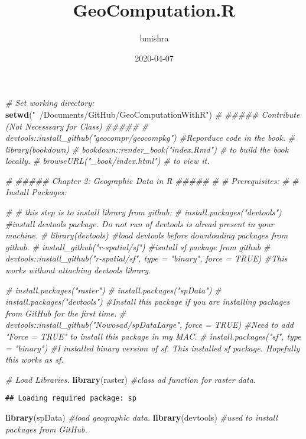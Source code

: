 \documentclass[]{article}
\title{GeoComputation.R}
\author{bmishra}
\date{2020-04-07}
\newenvironment{Shaded}{\begin{snugshade}}{\end{snugshade}}
\newcommand{\CommentTok}[1]{\textcolor[rgb]{0.56,0.35,0.01}{\textit{#1}}}
\newcommand{\KeywordTok}[1]{\textcolor[rgb]{0.13,0.29,0.53}{\textbf{#1}}}
\newcommand{\NormalTok}[1]{#1}
\newcommand{\StringTok}[1]{\textcolor[rgb]{0.31,0.60,0.02}{#1}}
\begin{document}
\maketitle

\begin{Shaded}
\begin{Highlighting}[]
\CommentTok{# Set working directory:}
\KeywordTok{setwd}\NormalTok{(}\StringTok{"~/Documents/GitHub/GeoComputationWithR"}\NormalTok{)}
\CommentTok{# ##### Contribute  (Not Necesssary for Class) #####}
\CommentTok{# devtools::install_github("geocompr/geocompkg") #Reporduce code in the book.}
\CommentTok{# library(bookdown)}
\CommentTok{# bookdown::render_book("index.Rmd") # to build the book locally.}
\CommentTok{# browseURL("_book/index.html") # to view it.}


\CommentTok{# ##### Chapter 2: Geographic Data in R #####}
\CommentTok{# # Prerequisites:}
\CommentTok{# # Install Packages:}

\CommentTok{# # this step is to install library from github:}
\CommentTok{# install.packages("devtools") #install devtools package. Do not run of devtools is alread present in your machine.}
\CommentTok{# library(devtools) #load devtools before downloading packages from github.}
\CommentTok{# install_github("r-spatial/sf") #isntall sf package from github}
\CommentTok{# devtools::install_github("r-spatial/sf", type = "binary", force = TRUE) #This works without attaching devtools library.}

\CommentTok{# install.packages("raster")}
\CommentTok{# install.packages("spData")}
\CommentTok{# install.packages("devtools") #Install this package if you are installing packages from GitHub for the first time.}
\CommentTok{# devtools::install_github("Nowosad/spDataLarge", force = TRUE) #Need to add "Force = TRUE" to install this package in my MAC.}
\CommentTok{# install.packages("sf", type = "binary") #I installed binary version of sf. This installed sf package. Hopefully this works as sf.}

\CommentTok{# Load Libraries.}
\KeywordTok{library}\NormalTok{(raster) }\CommentTok{#class ad function for raster data.}
\end{Highlighting}
\end{Shaded}

\begin{verbatim}
## Loading required package: sp
\end{verbatim}

\begin{Shaded}
\begin{Highlighting}[]
\KeywordTok{library}\NormalTok{(spData) }\CommentTok{#load geographic data.}
\KeywordTok{library}\NormalTok{(devtools) }\CommentTok{#used to install packages from GitHub.}
\end{Highlighting}
\end{Shaded}
\end{document}
